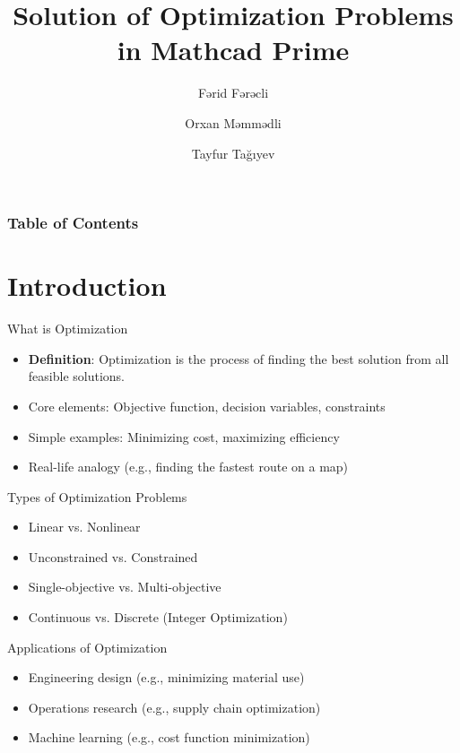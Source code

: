 \documentclass{beamer}
\title{\large Solution of Optimization Problems in Mathcad Prime\textsuperscript{\tiny\textregistered}}
\author{Fərid Fərəcli \and Orxan Məmmədli \and Tayfur Tağıyev}
\institute{Azerbaijan State Oil and Industry University}
\begin{document}
\maketitle

\begin{frame}
\frametitle{Table of Contents}
\tableofcontents
\end{frame}

\section{Introduction}

\begin{frame}{What is Optimization}
\begin{itemize}
\item \textbf{Definition}: Optimization is the process of finding the best solution from all feasible solutions.
\vspace{10pt}
\item Core elements: Objective function, decision variables, constraints
\vspace{10pt}
\item Simple examples: Minimizing cost, maximizing efficiency
\vspace{10pt}
\item Real-life analogy (e.g., finding the fastest route on a map)
\end{itemize}
\end{frame}

\begin{frame}{Types of Optimization Problems}
\begin{itemize}
\item Linear vs. Nonlinear
\item Unconstrained vs. Constrained
\item Single-objective vs. Multi-objective
\item Continuous vs. Discrete (Integer Optimization)
\end{itemize}
\end{frame}

\begin{frame}{Applications of Optimization}
\begin{itemize}
\item Engineering design (e.g., minimizing material use)
\item Operations research (e.g., supply chain optimization)
\item Machine learning (e.g., cost function minimization)
\end{itemize}
\end{frame}
\end{document}
